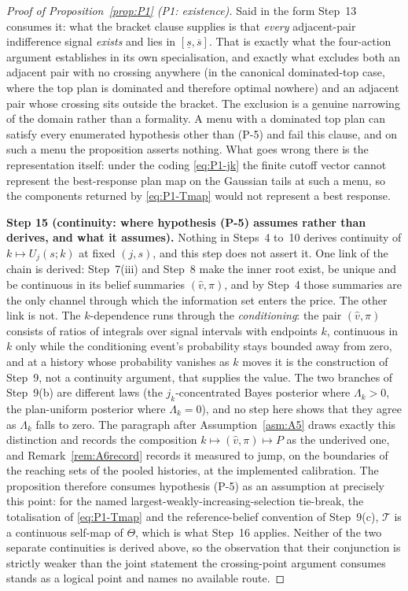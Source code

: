 \documentclass[11pt]{article}
\newcommand{\Tmap}{\mathcal{T}}
\begin{document}
\begin{proof}[Proof of Proposition~\ref{prop:P1} (P1: existence)]
Said in the form Step~13 consumes it: what the bracket clause supplies is that \emph{every}
adjacent-pair indifference signal \emph{exists} and lies in $[\underline s,\overline s]$. That is
exactly what the four-action argument establishes in its own specialisation, and exactly what
excludes both an adjacent pair with no crossing anywhere (in the canonical dominated-top case, where
the top plan is dominated and therefore optimal nowhere) and an adjacent pair whose crossing sits
outside the bracket. The exclusion is a genuine narrowing of the domain rather than a formality. A
menu with a dominated top plan can satisfy every enumerated hypothesis other than (P-5) and fail this
clause, and on such a menu the proposition asserts nothing. What goes wrong there is the
representation itself: under the coding \eqref{eq:P1-jk} the finite cutoff vector cannot represent
the best-response plan map on the Gaussian tails at such a menu, so the components returned by
\eqref{eq:P1-Tmap} would not represent a best response.

\smallskip
\noindent\textbf{Step 15 (continuity: where hypothesis (P-5) assumes rather than derives, and what it
assumes).}
Nothing in Steps~4 to~10 derives continuity of $k \mapsto U_j(s;k)$ at fixed $(j,s)$, and this step
does not assert it. One link of the chain is derived: Step~7(iii) and Step~8 make the inner root
exist, be unique and be continuous in its belief summaries $(\hat v,\pi)$, and by Step~4 those
summaries are the only channel through which the information set enters the price. The other link is
not. The $k$-dependence runs through the \emph{conditioning}: the pair $(\hat v,\pi)$ consists of
ratios of integrals over signal intervals with endpoints $k$, continuous in $k$ only while the
conditioning event's probability stays bounded away from zero, and at a history whose probability
vanishes as $k$ moves it is the construction of Step~9, not a continuity argument, that supplies the
value. The two branches of Step~9(b) are different laws (the $j_k$-concentrated Bayes posterior where
$\Lambda_k > 0$, the plan-uniform posterior where $\Lambda_k = 0$), and no step here shows that they
agree as $\Lambda_k$ falls to zero. The paragraph after Assumption~\ref{asm:A5} draws exactly this
distinction and records the composition $k \mapsto (\hat v,\pi) \mapsto P$ as the underived one, and
Remark~\ref{rem:A6record} records it measured to jump, on the boundaries of the reaching sets of the
pooled histories, at the implemented calibration. The proposition therefore consumes hypothesis (P-5)
as an assumption at precisely this point: for the named largest-weakly-increasing-selection
tie-break, the totalisation of \eqref{eq:P1-Tmap} and the reference-belief convention of Step~9(c),
$\Tmap$ is a continuous self-map of $\Theta$, which is what Step~16 applies. Neither of the two
separate continuities is derived above, so the observation that their conjunction is strictly weaker
than the joint statement the crossing-point argument consumes stands as a logical point and names no
available route.


\end{proof}
\end{document}

